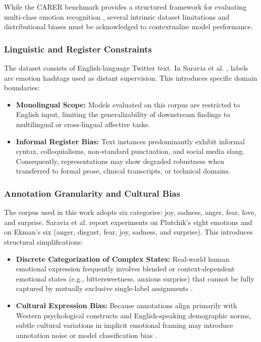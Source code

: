 \documentclass[conference]{IEEEtran}
\begin{document}
While the CARER benchmark provides a structured framework for evaluating multi-class emotion recognition \cite{saravia2018carer}, 
several intrinsic dataset limitations and distributional biases must be acknowledged to contextualize model performance.

\subsubsection{Linguistic and Register Constraints}
The dataset consists of English-language Twitter text. In Saravia et al. \cite{saravia2018carer}, labels are emotion hashtags used as distant supervision. 
This introduces specific domain boundaries:

\begin{itemize}
    \item \textbf{Monolingual Scope:} Models evaluated on this corpus are restricted to English input, limiting the generalizability of downstream findings to multilingual or cross-lingual affective tasks.
    \item \textbf{Informal Register Bias:} Text instances predominantly exhibit informal syntax, colloquialisms, non-standard punctuation, and social media slang. Consequently, representations may show degraded robustness when transferred to formal prose, clinical transcripts, or technical domains.
\end{itemize}

\subsubsection{Annotation Granularity and Cultural Bias}
The corpus used in this work adopts six categories: joy, sadness, anger, fear, love, and surprise. Saravia et al. \cite{saravia2018carer} report experiments on Plutchik's eight emotions and on Ekman's six (anger, disgust, fear, joy, sadness, and surprise). 
This introduces structural simplifications:

\begin{itemize}
    \item \textbf{Discrete Categorization of Complex States:} Real-world human emotional expression frequently involves blended or context-dependent emotional states (e.g., bittersweetness, anxious surprise) that cannot be fully captured by mutually exclusive single-label assignments \cite{cheng2026personality}.
    \item \textbf{Cultural Expression Bias:} Because annotations align primarily with Western psychological constructs and English-speaking demographic norms, subtle cultural variations in implicit emotional framing may introduce annotation noise or model classification bias \cite{chakriswaran2019emotion}.
\end{itemize}
\end{document}
